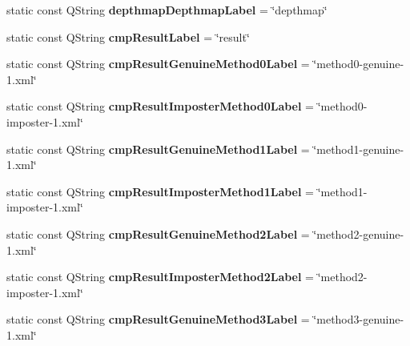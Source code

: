 \begin{DoxyCompactItemize}
\item 
\hypertarget{class_common_a41cc911310e6ec2a344517f3859a11b2}{static const Q\+String {\bfseries depthmap\+Depthmap\+Label} = \char`\"{}depthmap\char`\"{}}\label{class_common_a41cc911310e6ec2a344517f3859a11b2}

\item 
\hypertarget{class_common_a8b9fa86e6f603b163b8d633f16bf2e83}{static const Q\+String {\bfseries cmp\+Result\+Label} = \char`\"{}result\char`\"{}}\label{class_common_a8b9fa86e6f603b163b8d633f16bf2e83}

\item 
\hypertarget{class_common_a7816842b8938db53e6671516f989ece3}{static const Q\+String {\bfseries cmp\+Result\+Genuine\+Method0\+Label} = \char`\"{}method0-\/genuine-\/1.xml\char`\"{}}\label{class_common_a7816842b8938db53e6671516f989ece3}

\item 
\hypertarget{class_common_a0002cd6b25dd52c5006c7405e342118d}{static const Q\+String {\bfseries cmp\+Result\+Imposter\+Method0\+Label} = \char`\"{}method0-\/imposter-\/1.xml\char`\"{}}\label{class_common_a0002cd6b25dd52c5006c7405e342118d}

\item 
\hypertarget{class_common_aafd0bb9be73c16fc82424b922d57ab34}{static const Q\+String {\bfseries cmp\+Result\+Genuine\+Method1\+Label} = \char`\"{}method1-\/genuine-\/1.xml\char`\"{}}\label{class_common_aafd0bb9be73c16fc82424b922d57ab34}

\item 
\hypertarget{class_common_a37de792c82732bd3a489a5d516049b96}{static const Q\+String {\bfseries cmp\+Result\+Imposter\+Method1\+Label} = \char`\"{}method1-\/imposter-\/1.xml\char`\"{}}\label{class_common_a37de792c82732bd3a489a5d516049b96}

\item 
\hypertarget{class_common_ad5cc2a4983c99a6790a272c76bacae5d}{static const Q\+String {\bfseries cmp\+Result\+Genuine\+Method2\+Label} = \char`\"{}method2-\/genuine-\/1.xml\char`\"{}}\label{class_common_ad5cc2a4983c99a6790a272c76bacae5d}

\item 
\hypertarget{class_common_a14e29a34ebead70eb314a2354ceb1767}{static const Q\+String {\bfseries cmp\+Result\+Imposter\+Method2\+Label} = \char`\"{}method2-\/imposter-\/1.xml\char`\"{}}\label{class_common_a14e29a34ebead70eb314a2354ceb1767}

\item 
\hypertarget{class_common_ac828a49eb752aa6e35539cfc9f6e18c3}{static const Q\+String {\bfseries cmp\+Result\+Genuine\+Method3\+Label} = \char`\"{}method3-\/genuine-\/1.xml\char`\"{}}\label{class_common_ac828a49eb752aa6e35539cfc9f6e18c3}


\end{DoxyCompactItemize}

